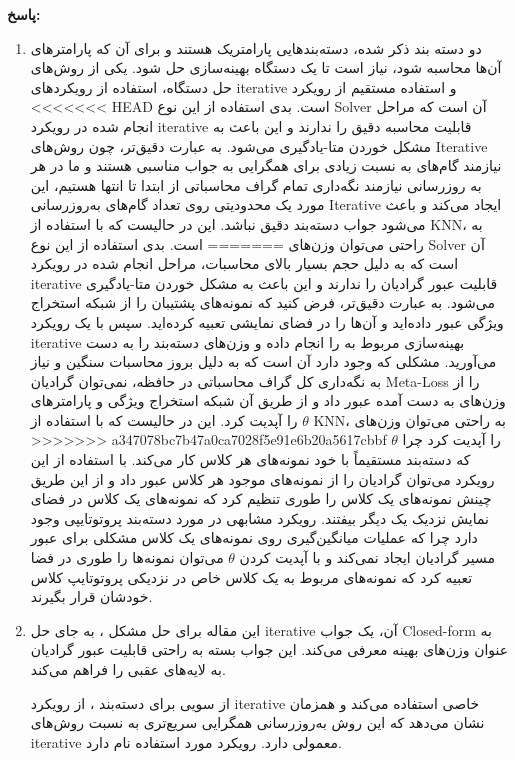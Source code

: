 \documentclass{article}
\begin{document}
\textbf{پاسخ:}

\begin{enumerate}
	\item
دو دسته بند ذکر شده، دسته‌بندهایی پارامتریک هستند و برای آن که پارامترهای آن‌ها محاسبه شود، نیاز است تا یک دستگاه بهینه‌سازی حل شود. یکی از روش‌های حل دستگاه، استفاده از رویکردهای iterative و استفاده مستقیم از رویکرد 
<<<<<<< HEAD
 است. بدی استفاده از این نوع Solver آن است که مراحل انجام شده در رویکرد iterative قابلیت محاسبه دقیق را ندارند و این باعث به مشکل خوردن متا-یادگیری می‌شود. به عبارت دقیق‌تر، چون روش‌های Iterative نیازمند گام‌های به نسبت زیادی برای همگرایی به جواب مناسبی هستند و ما در هر به روزرسانی نیازمند نگه‌داری تمام گراف محاسباتی از ابتدا تا انتها هستیم،‌ این مورد یک محدودیتی روی تعداد گام‌های به‌روزرسانی Iterative ایجاد می‌کند و باعث می‌شود جواب دسته‌بند دقیق نباشد. این در حالیست که با استفاده از KNN، به راحتی می‌توان وزن‌های 
=======
 است. بدی استفاده از این نوع Solver آن است که به دلیل حجم بسیار بالای محاسبات، مراحل انجام شده در رویکرد iterative قابلیت عبور گرادیان را ندارند و این باعث به مشکل خوردن متا-یادگیری می‌شود. به عبارت دقیق‌تر، فرض کنید که نمونه‌های پشتیبان را از شبکه استخراج ویژگی عبور داده‌اید و آن‌ها را در فضای نمایشی تعبیه کرده‌اید. سپس با یک رویکرد iterative بهینه‌سازی مربوط به 
  را انجام داده و وزن‌های دسته‌بند را به دست می‌آورید. مشکلی که وجود دارد آن است که به دلیل بروز محاسبات سنگین و نیاز به نگه‌داری کل گراف محاسباتی در حافظه، نمی‌توان گرادیان Meta-Loss را از وزن‌های به دست آمده عبور داد و از طریق آن شبکه استخراج ویژگی و پارامترهای 
$\theta$
را آپدیت کرد. این در حالیست که با استفاده از KNN، به راحتی می‌توان وزن‌های 
>>>>>>> a347078bc7b47a0ca7028f5e91e6b20a5617cbbf
$\theta$
را آپدیت کرد چرا که دسته‌بند مستقیماً با خود نمونه‌های هر کلاس کار می‌کند. با استفاده از این رویکرد می‌توان گرادیان را از نمونه‌های موجود هر کلاس عبور داد و از این طریق چینش نمونه‌های یک کلاس را طوری تنظیم کرد که نمونه‌های یک کلاس در فضای نمایش نزدیک یک دیگر بیفتند. رویکرد مشابهی در مورد دسته‌بند پروتوتایپی وجود دارد چرا که عملیات میانگین‌گیری روی نمونه‌های یک کلاس مشکلی برای عبور مسیر گرادیان ایجاد نمی‌کند و با آپدیت کردن 
$\theta$
می‌توان نمونه‌ها را طوری در فضا تعبیه کرد که نمونه‌های مربوط به یک کلاس خاص در نزدیکی پروتوتایپ کلاس خودشان قرار بگیرند.
	\item
	این مقاله برای حل مشکل
	، به جای حل iterative آن، یک جواب Closed-form به عنوان وزن‌های بهینه معرفی می‌کند. این جواب بسته به راحتی قابلیت عبور گرادیان به لایه‌های عقبی را فراهم می‌کند.
	
	از سویی برای دسته‌بند
	 ، از رویکرد iterative خاصی استفاده می‌کند و همزمان نشان می‌دهد که این روش به‌روزرسانی همگرایی سریع‌تری به نسبت روش‌های iterative معمولی دارد. رویکرد مورد استفاده 
	نام دارد.
	

\end{enumerate}
\end{document}

